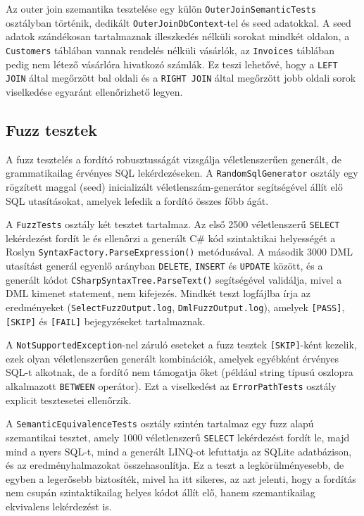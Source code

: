 \documentclass[a4paper,12pt]{article}
\begin{document}
Az outer join szemantika tesztelése egy külön \texttt{OuterJoinSemanticTests} osztályban történik, dedikált \texttt{OuterJoinDbContext}-tel és seed adatokkal. A seed adatok szándékosan tartalmaznak illeszkedés nélküli sorokat mindkét oldalon, a \texttt{Customers} táblában vannak rendelés nélküli vásárlók, az \texttt{Invoices} táblában pedig nem létező vásárlóra hivatkozó számlák. Ez teszi lehetővé, hogy a \texttt{LEFT JOIN} által megőrzött bal oldali és a \texttt{RIGHT JOIN} által megőrzött jobb oldali sorok viselkedése egyaránt ellenőrizhető legyen.

\subsection{Fuzz tesztek}

A fuzz tesztelés a fordító robusztusságát vizsgálja véletlenszerűen generált, de grammatikailag érvényes SQL lekérdezéseken. A \texttt{RandomSqlGenerator} osztály egy rögzített maggal (seed) inicializált véletlenszám-generátor segítségével állít elő SQL utasításokat, amelyek lefedik a fordító összes főbb ágát.

A \texttt{FuzzTests} osztály két tesztet tartalmaz. Az első 2500 véletlenszerű \texttt{SELECT} lekérdezést fordít le és ellenőrzi a generált C\# kód szintaktikai helyességét a Roslyn \texttt{SyntaxFactory.ParseExpression()} metódusával. A második 3000 DML utasítást generál egyenlő arányban \texttt{DELETE}, \texttt{INSERT} és \texttt{UPDATE} között, és a generált kódot \texttt{CSharpSyntaxTree.ParseText()} segítségével validálja, mivel a DML kimenet statement, nem kifejezés. Mindkét teszt logfájlba írja az eredményeket (\texttt{SelectFuzzOutput.log}, \texttt{DmlFuzzOutput.log}), amelyek \texttt{[PASS]}, \texttt{[SKIP]} és \texttt{[FAIL]} bejegyzéseket tartalmaznak.

A \texttt{NotSupportedException}-nel záruló eseteket a fuzz tesztek \texttt{[SKIP]}-ként kezelik, ezek olyan véletlenszerűen generált kombinációk, amelyek egyébként érvényes SQL-t alkotnak, de a fordító nem támogatja őket (például string típusú oszlopra alkalmazott \texttt{BETWEEN} operátor). Ezt a viselkedést az \texttt{ErrorPathTests} osztály explicit tesztesetei ellenőrzik.

A \texttt{SemanticEquivalenceTests} osztály szintén tartalmaz egy fuzz alapú szemantikai tesztet, amely 1000 véletlenszerű \texttt{SELECT} lekérdezést fordít le, majd mind a nyers SQL-t, mind a generált LINQ-ot lefuttatja az SQLite adatbázison, és az eredményhalmazokat összehasonlítja. Ez a teszt a legkörülményesebb, de egyben a legerősebb biztosíték, mivel ha itt sikeres, az azt jelenti, hogy a fordítás nem csupán szintaktikailag helyes kódot állít elő, hanem szemantikailag ekvivalens lekérdezést is.
\end{document}
